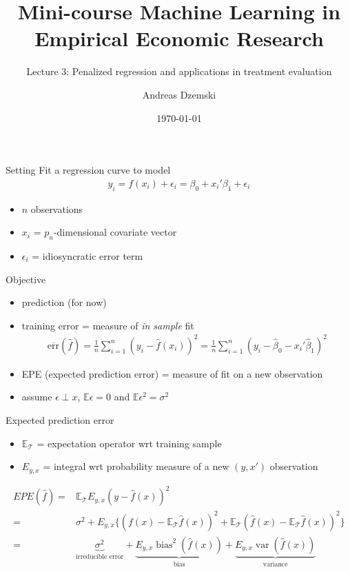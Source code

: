 \documentclass[xcolor=dvipsnames, handout]{beamer}
\author[Dzemski]{Andreas Dzemski\inst{1}}
\institute{\inst{1} University of Gothenburg}
\title{Mini-course Machine Learning in Empirical Economic Research}
\subtitle{Lecture 3: Penalized regression and applications in treatment evaluation}
\date{\today}
\newcommand{\E}{\mathbb{E}}
\DeclareMathOperator{\bias}{bias}
\DeclareMathOperator{\var}{var}
\begin{document}
\maketitle

\begin{frame}{Setting}
Fit a regression curve to model
\begin{align*}
  y_i = f(x_i) + \epsilon_i = \beta_0 + x_i'\beta_1 + \epsilon_i
\end{align*}
\begin{itemize}
  \item $n$ observations
  \item $x_i$ = $p_n$-dimensional covariate vector
  \item $\epsilon_i$ = idiosyncratic error term
\end{itemize}
\end{frame}

\begin{frame}{Objective}
\begin{itemize}
  \item prediction (for now)
  \item training error = measure of \emph{in sample} fit
  \begin{align*}
  \overline{\text{err}} (\hat{f}) 
  = 
    \frac{1}{n} \sum_{i=1}^n \left(y_i - \hat{f}(x_i)\right)^2 
    = 
    \frac{1}{n} \sum_{i=1}^n \left(y_i - \hat{\beta}_0 - x_i'\hat{\beta}_1 \right)^2  
  \end{align*}
  \item EPE (expected prediction error) = measure of fit on a new observation
  \item assume $\epsilon \perp x$, $\E \epsilon = 0$ and $\E \epsilon^2 = \sigma^2$
\end{itemize}
\end{frame}


\begin{frame}{Expected prediction error}
\begin{itemize}
  \item $\E_{\mathcal{T}}$ = expectation operator wrt training sample
  \item $E_{y,x}$ = integral wrt probability measure of a new $(y, x')$ observation  
\end{itemize}
\begin{align*}
  EPE (\hat{f}) =& \E_{\mathcal{T}} E_{y,x} \left(y - \hat{f} (x) \right)^2
  \\
  =& \sigma^2 + E_{y,x} 
  \Big\{ 
    \left(f(x) - \E_{\mathcal{T}}\hat{f}(x)\right)^2 
    + \E_{\mathcal{T}} \left(\hat{f}(x) - \E_{\mathcal{T}} \hat{f}(x)\right)^2 
  \Big\}
\\
  =& \underbrace{\sigma^2}_{\text{irreducible error}} + 
  \underbrace{E_{y,x} \bias^2\left(\hat{f}(x)\right)}_{\text{bias}} + 
  \underbrace{E_{y,x} \var\left(\hat{f}(x)\right)}_{\text{variance}}
\end{align*}
\end{frame}
\end{document}
